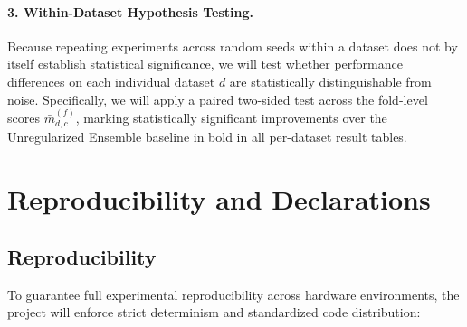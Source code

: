 \documentclass[11pt, a4paper]{article}
\begin{document}
\paragraph{3. Within-Dataset Hypothesis Testing.}
Because repeating experiments across random seeds within a dataset does not by itself establish statistical significance, we will test whether performance differences on each individual dataset $d$ are statistically distinguishable from noise. Specifically, we will apply a paired two-sided test across the fold-level scores $\bar{m}_{d,c}^{(f)}$, marking statistically significant improvements over the Unregularized Ensemble baseline in bold in all per-dataset result tables.

\section{Reproducibility and Declarations}

\subsection{Reproducibility}
To guarantee full experimental reproducibility across hardware environments, the project will enforce strict determinism and standardized code distribution:
\end{document}
